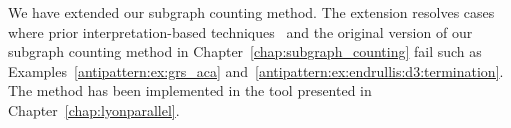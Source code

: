 We have extended our subgraph counting method.
The extension resolves cases where prior interpretation-based techniques~\cite{zantema2014termination,bruggink2014termination,bruggink2015proving,endrullis2024generalized_arxiv_v2,overbeek2024termination_lmcs}
and the original version of our subgraph counting method in Chapter~\ref{chap:subgraph_counting}
fail such as Examples~\ref{antipattern:ex:grs_aca} and~\ref{antipattern:ex:endrullis:d3:termination}.
The method has been implemented in the tool presented in Chapter~\ref{chap:lyonparallel}.

